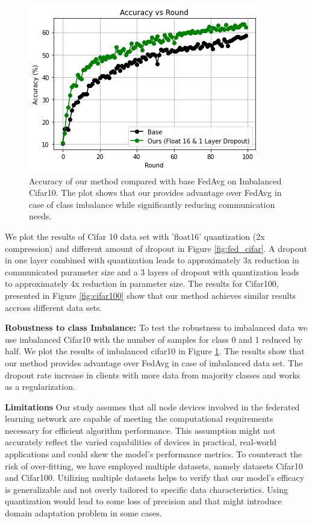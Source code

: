\documentclass{article}
\begin{document}
\begin{figure}
  \centering
\includegraphics[width = .5\linewidth, height = .4\linewidth]{img/Acc_Cifar10_Imb.png}
\caption{Accuracy of our method compared with base FedAvg on Imbalanced Cifar10. The plot shows that our provides advantage over FedAvg in case of class imbalance while significantly reducing communication needs.}
  \label{fig:imb_cifar}
\end{figure}


We plot the results of Cifar 10 data set with 'float16' quantization (2x compression) and different amount of dropout in Figure \ref{fig:fed_cifar}. A dropout in one layer combined with quantization leads to approximately 3x reduction in communicated parameter size and a 3 layers of dropout with quantization leads to approximately 4x reduction in parameter size. The results for Cifar100, presented in Figure \ref{fig:cifar100} show that our method achieves similar results accross different data sets.


\textbf{Robustness to class Imbalance: }To test the robustness to imbalanced data we use imbalanced Cifar10 with the number of samples for class 0 and 1 reduced by half. We plot the results of imbalanced cifar10 in Figure \ref{fig:imb_cifar}. The results show that our method provides advantage over FedAvg in case of imbalanced data set. The dropout rate increase in clients with more data from majority classes and works as a regularization.

\textbf{Limitations}
Our study assumes that all node devices involved in the federated learning network are capable of meeting the computational requirements necessary for efficient algorithm performance. This assumption might not accurately reflect the varied capabilities of devices in practical, real-world applications and could skew the model's performance metrics. To counteract the risk of over-fitting, we have employed multiple datasets, namely datasets Cifar10 and Cifar100. Utilizing multiple datasets helps to verify that our model's efficacy is generalizable and not overly tailored to specific data characteristics. Using quantization would lead to some loss of precision and that might introduce domain adaptation problem in some cases. 
\end{document}
